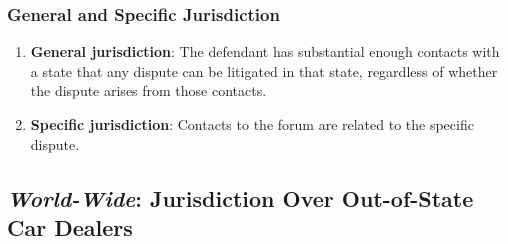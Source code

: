 \subsubsection{General and Specific Jurisdiction}

\begin{enumerate}
    \item \textbf{General jurisdiction}: The defendant has substantial enough contacts with a state that any dispute can be litigated in that state, regardless of whether the dispute arises from those contacts.
    \item \textbf{Specific jurisdiction}: Contacts to the forum are related to the specific dispute.
\end{enumerate}

\subsection{\emph{World-Wide}: Jurisdiction Over Out-of-State Car Dealers}

